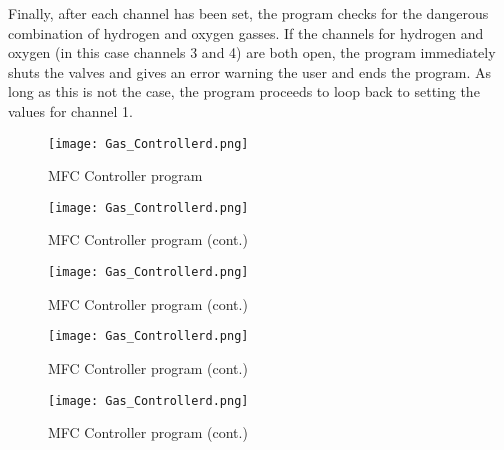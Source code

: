     Finally, after each channel has been set, the program checks for the dangerous combination of hydrogen and oxygen gasses.
    If the channels for hydrogen and oxygen (in this case channels 3 and 4) are both open, the program immediately shuts the valves and gives an error warning the user and ends the program.
    As long as this is not the case, the program proceeds to loop back to setting the values for channel 1.

    \begin{landscape}
        \begin{figure}
            \begin{center}
            \texttt{[image: Gas\_Controllerd.png]}
            \end{center}
            \caption{MFC Controller program}
            \label{fig:mfcvi}
        \end{figure}

        \begin{figure}\ContinuedFloat
            \begin{center}
            \texttt{[image: Gas\_Controllerd.png]}
            \end{center}
            \caption[]{MFC Controller program (cont.)}
        \end{figure}

        \begin{figure}\ContinuedFloat
            \begin{center}
            \texttt{[image: Gas\_Controllerd.png]}
            \end{center}
            \caption[]{MFC Controller program (cont.)}
        \end{figure}

        \begin{figure}\ContinuedFloat
            \begin{center}
            \texttt{[image: Gas\_Controllerd.png]}
            \end{center}
            \caption[]{MFC Controller program (cont.)}
        \end{figure}

        \begin{figure}\ContinuedFloat
            \begin{center}
            \texttt{[image: Gas\_Controllerd.png]}
            \end{center}
            \caption[]{MFC Controller program (cont.)}
        \end{figure}


\end{landscape}
